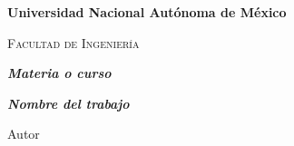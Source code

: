 \documentclass[legalpaper]{article} %
\begin{document}
\begin{titlepage}
        \centering
        {\bfseries\LARGE Universidad Nacional Autónoma de México \par}
        \vspace{1cm}
        {\scshape\Large Facultad de Ingenier\'ia \par}
        \vspace{3cm}
        {\itshape\Large \textbf{Materia o curso\\} \par} 
        \vspace{1cm}
        {\itshape\Large \textbf{Nombre del trabajo\\} \par}
        \vspace{1cm}
        \vfill
        {\Large Autor \\\par}
        \vfill
        {\Large \date{\today} \par}
    \end{titlepage}
	
\end{document}
